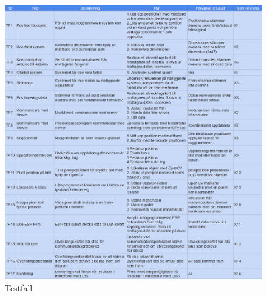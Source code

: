\documentclass[11pt, a4paper]{report}
\begin{document}
\begin{figure}[H]
	\begin{center}
		\includegraphics[width=15cm]{systemkrav.PNG}
		\caption{Testfall}
		\label{fig:testfall}
	\end{center}
\end{figure}
\end{document}
